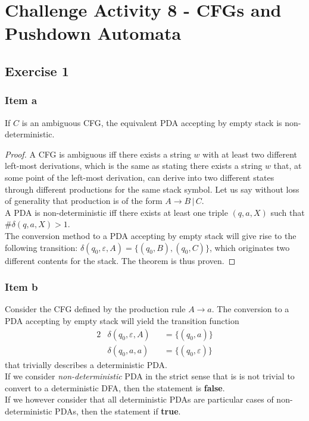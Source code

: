 \setcounter{section}{7}
\section{Challenge Activity 8 - CFGs and Pushdown Automata}
\subsection{Exercise 1}%
{
\renewcommand{\thesubsubsection}{\thesubsection\alph{subsubsection}}
\subsubsection{Item a}
\begin{theorem}
If $C$ is an ambiguous CFG, the equivalent PDA accepting by empty stack is non-deterministic.
\end{theorem}
\begin{proof}
A CFG is ambiguous iff there exists a string $w$ with at least two different left-most derivations, which is the same as stating there exists a string $w$ that, at some point of the left-most derivation, can derive into two different states through different productions for the same stack symbol. Let us say without loss of generality that production is of the form $A \rightarrow B\,|\,C$.\\
A PDA is non-deterministic iff there exists at least one triple $(q,a,X)$ such that $\#\delta(q, a, X) > 1$.\\
The conversion method to a PDA accepting by empty stack will give rise to the following transition: $\delta(q_0, \varepsilon, A)=\{(q_0,B),(q_0,C)\}$, which originates two different contents for the stack. The theorem is thus proven.
\end{proof}
\subsubsection{Item b}
Consider the CFG defined by the production rule $A \rightarrow a$. The conversion to a PDA accepting by empty stack will yield the transition function
\begin{alignat*}{2}
	&\delta(q_0,\varepsilon,A) &&= \{(q_0, a)\}\\
	&\delta(q_0,a          ,a) &&= \{(q_0, \varepsilon)\} 
\end{alignat*}
that trivially describes a deterministic PDA.\\
If we consider \textit{non-deterministic} PDA in the strict sense that is is not trivial to convert to a deterministic DFA, then the statement is \textbf{false}.\\
If we however consider that all deterministic PDAs are particular cases of non-deterministic PDAs, then the statement if \textbf{true}.
}
